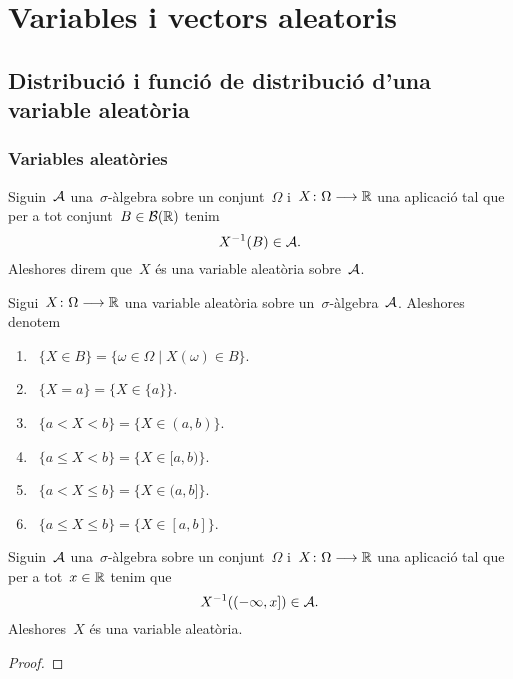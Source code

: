 \documentclass[../../main.tex]{subfiles}
\begin{document}
\chapter{Variables i vectors aleatoris}
\section{Distribució i funció de distribució d'una variable aleatòria}
\subsection{Variables aleatòries}
	\begin{definition}
		\label{def:variable aleatòria}
		Siguin~\(\mathcal{A}\) una~\(\sigma\)-àlgebra sobre un conjunt~\(\Omega\) i~\(X\colon\Omega\longrightarrow\mathbb{R}\) una aplicació tal que per a tot conjunt~\(B\in\mathcal{B}(\mathbb{R})\) tenim
		\[
		    X^{-1}(B)\in\mathcal{A}.
		\]
		Aleshores direm que~\(X\) és una variable aleatòria sobre~\(\mathcal{A}\).
	\end{definition}
	\begin{example}
	\end{example}
	\begin{notation}
		\label{not:variables aleatòries}
		Sigui~\(X\colon\Omega\longrightarrow\mathbb{R}\) una variable aleatòria sobre un~\(\sigma\)-àlgebra~\(\mathcal{A}\).
		Aleshores denotem
		\begin{enumerate}
			\item~\(\{X\in B\}=\{\omega\in\Omega\mid X(\omega)\in B\}\).
			\item~\(\{X=a\}=\{X\in\{a\}\}\).
			\item~\(\{a< X<b\}=\{X\in(a,b)\}\).
			\item~\(\{a\leq X<b\}=\{X\in[a,b)\}\).
			\item~\(\{a< X\leq b\}=\{X\in(a,b]\}\).
			\item~\(\{a\leq X\leq b\}=\{X\in[a,b]\}\).
		\end{enumerate}
	\end{notation}
	\begin{proposition}
		\label{prop:condició suficient per ser una variable aleatòria}
		Siguin~\(\mathcal{A}\) una~\(\sigma\)-àlgebra sobre un conjunt~\(\Omega\) i~\(X\colon\Omega\longrightarrow\mathbb{R}\) una aplicació tal que per a tot~\(x\in\mathbb{R}\) tenim que
		\[
		    X^{-1}((-\infty,x])\in\mathcal{A}.
		\]
		Aleshores~\(X\) és una variable aleatòria.
		\begin{proof}
		\end{proof}
	\end{proposition}
\end{document}
